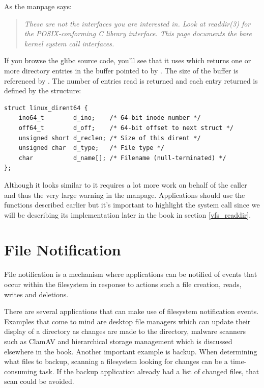 \noindent
As the manpage says:

\begin{quote}
\textit{These are not the interfaces you are interested in.  Look at readdir(3)
for the POSIX-conforming C library interface.  This page documents  the
bare kernel system call interfaces.}
\end{quote}

\noindent
If you browse the glibc source code, you'll see that it uses  which returns one or more directory entries in the buffer pointed to by . The size of the buffer is referenced by . The number of entries read is returned and each entry returned is defined by the  structure:

\begin{lstlisting}
struct linux_dirent64 {
    ino64_t        d_ino;    /* 64-bit inode number */
    off64_t        d_off;    /* 64-bit offset to next struct */
    unsigned short d_reclen; /* Size of this dirent */
    unsigned char  d_type;   /* File type */
    char           d_name[]; /* Filename (null-terminated) */
};
\end{lstlisting}

\noindent
Although it looks similar to  it requires a lot more work on behalf of the caller and thus the very large warning in the manpage. Applications should use the functions described earlier but it's important to highlight the system call since we will be describing its implementation later in the book in section \ref{vfs_readdir}.


\section{File Notification}\label{fanotify}

File notification is a mechanism where applications can be notified of events that occur within the filesystem in response to actions such a file creation, reads, writes and deletions.

There are several applications that can make use of filesystem notification events. Examples that come to mind are desktop file managers which can update their display of a directory as changes are made to the directory, malware scanners such as ClamAV and hierarchical storage management which is discussed elsewhere in the book. Another important example is backup. When determining what files to backup, scanning a filesystem looking for changes can be a time-consuming task. If the backup application already had a list of changed files, that scan could be avoided.

